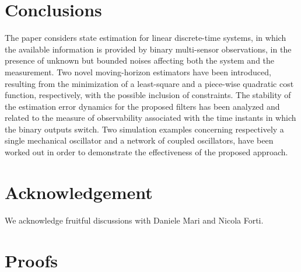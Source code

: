 \documentclass[11pt,journal,onecolumn]{IEEEtran}
\begin{document}
\section{Conclusions}

The paper considers state estimation for linear discrete-time systems, in which the available information is provided by binary multi-sensor observations,
in the presence of unknown but bounded noises affecting both the system and the measurement. Two novel moving-horizon estimators have been introduced, resulting from the minimization of a least-square and a piece-wise quadratic cost function, respectively, with the possible inclusion of constraints. The stability of the estimation error dynamics for the proposed filters has been analyzed and related to the measure of observability
associated with the time instants in which the binary outputs switch. Two simulation examples concerning respectively a single mechanical oscillator and a network of coupled oscillators, have been worked out in order to demonstrate the effectiveness of the proposed approach.

\section*{Acknowledgement}

We acknowledge fruitful discussions with Daniele Mari and Nicola Forti.

\appendix

\section{Proofs}
\end{document}
